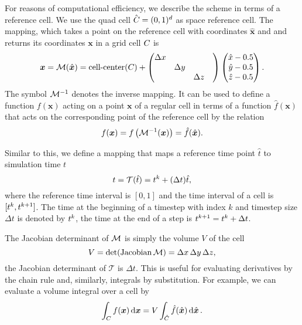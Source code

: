 For reasons of computational efficiency, we describe the scheme in terms of a reference cell.
We use the quad cell $\hat{C_{}} = (0, 1)^d$ as space reference cell.
The mapping, which takes a point on the reference cell with coordinates $\hat{\bm{x}}$ and and returns its coordinates $\bm{x}$ in a grid cell $C_{}$ is
\begin{equation}\label{eq:space-mapping}
  \bm{x} = \mathcal{M} (\hat{\bm{x}}) =
  \operatorname{cell-center}(C_{}) +
\begin{pmatrix}
\Delta x && \\
&\Delta y & \\
&&\Delta z&
\end{pmatrix}
  \begin{pmatrix}
    \hat{x} - 0.5\\
    \hat{y} - 0.5\\
    \hat{z} - 0.5
  \end{pmatrix}.
\end{equation}
The symbol $\mathcal{M}^{-1}$ denotes the inverse mapping.
It can be used to define a function $f(\bm{x})$ acting on a point $\bm{x}$ of a regular cell in terms of a function $\hat{f}(\bm{x})$ that acts on the corresponding point of the reference cell by the relation
\begin{equation}
  \label{eq:function-ref-cell}
  f(\bm{x}) = f\left( \mathcal{M}^{-1}(\bm{x}) \right) = \hat{f}(\hat{\bm{x}}).
\end{equation}

Similar to this, we define a mapping that maps a reference time point $\hat t$ to simulation time $t$
\newcommand{\timeMapping}{\mathcal{T}}
\begin{equation}
  \label{eq:time-mapping}
  t = \timeMapping(\hat{t}) = \curTime + (\Delta t) \hat{t},
\end{equation}
where the reference time interval is $[0,1]$ and the time interval of a cell is $[t^k, t^{k+1}]$.
The time at the beginning of a timestep with index $k$ and timestep size $\Delta t$ is denoted by $t^k$, the time at the end of a step is $t^{k+1} = t^k + \Delta t$.

The Jacobian determinant of $\mathcal{M}$ is simply the volume $V$ of the cell
\begin{equation}
  \label{eq:determinant-mapping}
  V = \operatorname{det}(\operatorname{Jacobian}\mathcal{M}) = \Delta x \, \Delta y \,\Delta z,
\end{equation}
the Jacobian determinant of $\timeMapping$ is $\Delta t$.
This is useful for evaluating derivatives by the chain rule and, similarly, integrals by substitution.
For example, we can evaluate a volume integral over a cell by
\begin{equation}
  \label{eq:integration-by-substitution}
  \int_{C_{}} 
f(\bm{x})
   \dd{\bm{x}}
  =
V \int_{\hat{C}_{}} 
    \hat{f}(\hat{\bm{x}})
   \dd{\hat{\bm{x}}}.
\end{equation}

